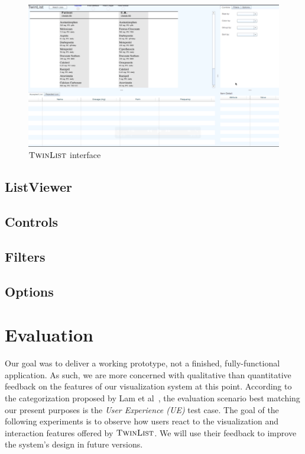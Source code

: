 \documentclass{chi2009}
\newcommand{\TwinList}{\textsc{TwinList}}
\begin{document}
\begin{figure}
\begin{center}
\includegraphics[width=1.1\linewidth]{interface}
\end{center}
   \caption{$\TwinList$ interface}
   \label{fig:interface}
\end{figure}

\subsection{ListViewer}

\subsection{Controls}

\subsection{Filters}

\subsection{Options}

\section{Evaluation}
Our goal was to deliver a working prototype, not a finished, fully-functional application. As such, we are more concerned with qualitative than quantitative feedback on the features of our visualization system at this point. According to the categorization proposed by Lam et al~\cite{lam-bertini-isenberg-plaisant-carpendale-2011}, the evaluation scenario best matching our present purposes is the \textit{User Experience (UE)} test case. The goal of the following experiments is to observe how users react to the visualization and interaction features offered by $\TwinList$. We will use their feedback to improve the system's design in future versions.
\end{document}
